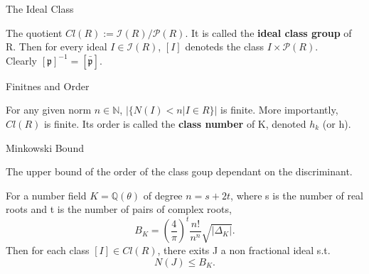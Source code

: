 \documentclass[12pt, letterpaper]{article}
\newcommand{\Q}{\mathbb{Q}}
\newcommand{\N}{\mathbb{N}}
\newcommand{\p}{\mathfrak{p}}
\begin{document}
\begin{section}{The Ideal Class}

  The quotient \(Cl(R) := \mathcal{I}(R) / \mathcal{P}(R)\). It is called the
  \textbf{ideal class group} of R. Then for every ideal \(I \in
  \mathcal{I}(R)\), \([I]\) denoteds the class \(I \times \mathcal{P}(R)\). \\
  Clearly \([\p]^{-1} = [\bar{\p}]\).

  \begin{subsection}{Finitnes and Order}

    For any given norm \(n \in \N\), \(|\{ N(I) < n | I \in R \}|\) is finite.
    More importantly, \(Cl(R)\) is finite. Its order is called the \textbf{class
      number} of K, denoted \(h_{k}\) (or h).

    \begin{subsubsection}{Minkowski Bound}

      The upper bound of the order of the class goup dependant on the
      discriminant.

      For a number field \(K = \Q(\theta)\) of degree \(n = s + 2t\), where s is
      the number of real roots and t is the number of pairs of complex roots,
      \[B_{K} = (\frac{4}{\pi})^{t} \frac{n!}{n^{n}} \sqrt{| \Delta_{K} |}.\]
      Then for each class \([I] \in Cl(R)\), there exits J a non fractional
      ideal s.t.\ \[N(J) \leq B_{K}.\]

    \end{subsubsection}

  \end{subsection}

\end{section}
\end{document}
